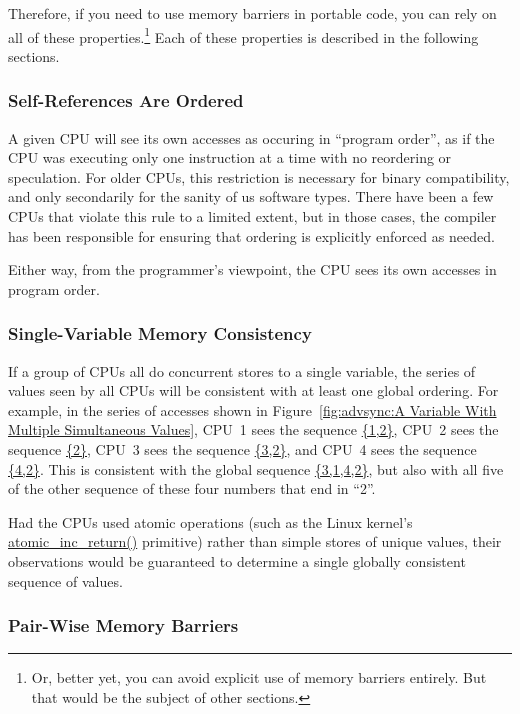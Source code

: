 Therefore, if you need to use memory barriers in portable code,
you can rely on all of these properties.\footnote{
	Or, better yet, you can avoid explicit use of memory barriers
	entirely.
	But that would be the subject of other sections.}
Each of these properties is described in the following sections.

\subsubsection{Self-References Are Ordered}

A given CPU will see its own accesses as occuring in ``program order'',
as if the CPU was executing only one instruction at a time with no
reordering or speculation.
For older CPUs, this restriction is necessary for binary compatibility,
and only secondarily for the sanity of us software types.
There have been a few CPUs that violate this rule to a limited extent,
but in those cases, the compiler has been responsible
for ensuring that ordering is explicitly enforced as needed.

Either way, from the programmer's viewpoint, the CPU sees its own accesses
in program order.

\subsubsection{Single-Variable Memory Consistency}

If a group of CPUs all do concurrent stores to a single variable,
the series of values seen by all CPUs will be consistent with at
least one global ordering.
For example, in the series of accesses shown in
Figure~\ref{fig:advsync:A Variable With Multiple Simultaneous Values},
CPU~1 sees the sequence \url{{1,2}},
CPU~2 sees the sequence \url{{2}},
CPU~3 sees the sequence \url{{3,2}},
and
CPU~4 sees the sequence \url{{4,2}}.
This is consistent with the global sequence \url{{3,1,4,2}},
but also with all five of the other sequence of these four numbers that end
in ``2''.

Had the CPUs used atomic operations (such as the Linux kernel's
\url{atomic_inc_return()} primitive) rather than simple stores of
unique values, their observations would
be guaranteed to determine a single globally consistent sequence of values.

\subsubsection{Pair-Wise Memory Barriers}

